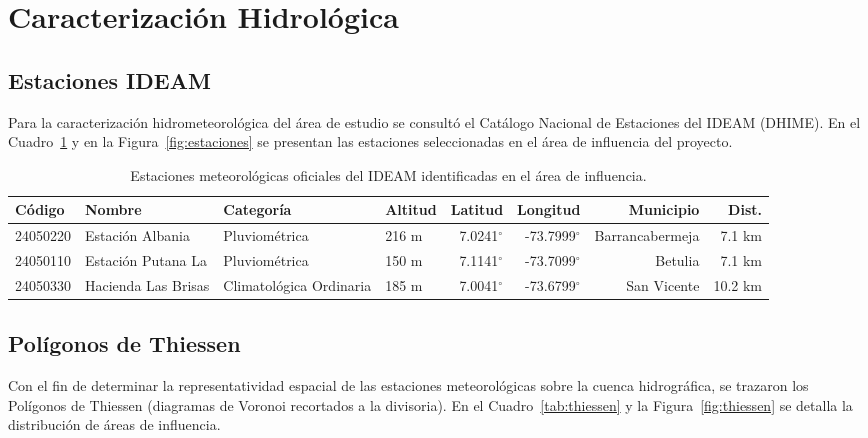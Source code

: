 \documentclass[11pt,a4paper]{article}
\begin{document}
\section{Caracterización Hidrológica}

\subsection{Estaciones IDEAM}
Para la caracterización hidrometeorológica del área de estudio se consultó el Catálogo Nacional de Estaciones del IDEAM (DHIME). En el Cuadro~\ref{tab:estaciones_ideam} y en la Figura~\ref{fig:estaciones} se presentan las estaciones seleccionadas en el área de influencia del proyecto.

\begin{table}[H]
\centering
\caption{Estaciones meteorológicas oficiales del IDEAM identificadas en el área de influencia.}
\label{tab:estaciones_ideam}
\begin{tabular}{llllrrrr}\toprule
\textbf{Código} & \textbf{Nombre} & \textbf{Categoría} & \textbf{Altitud} & \textbf{Latitud} & \textbf{Longitud} & \textbf{Municipio} & \textbf{Dist.} \\\midrule
24050220 & Estación Albania & Pluviométrica & 216 m & 7.0241$^\circ$ & -73.7999$^\circ$ & Barrancabermeja & 7.1 km \\
24050110 & Estación Putana La & Pluviométrica & 150 m & 7.1141$^\circ$ & -73.7099$^\circ$ & Betulia & 7.1 km \\
24050330 & Hacienda Las Brisas & Climatológica Ordinaria & 185 m & 7.0041$^\circ$ & -73.6799$^\circ$ & San Vicente & 10.2 km \\
\bottomrule
\end{tabular}
\end{table}



\subsection{Polígonos de Thiessen}
Con el fin de determinar la representatividad espacial de las estaciones meteorológicas sobre la cuenca hidrográfica, se trazaron los Polígonos de Thiessen (diagramas de Voronoi recortados a la divisoria). En el Cuadro~\ref{tab:thiessen} y la Figura~\ref{fig:thiessen} se detalla la distribución de áreas de influencia.
\end{document}
